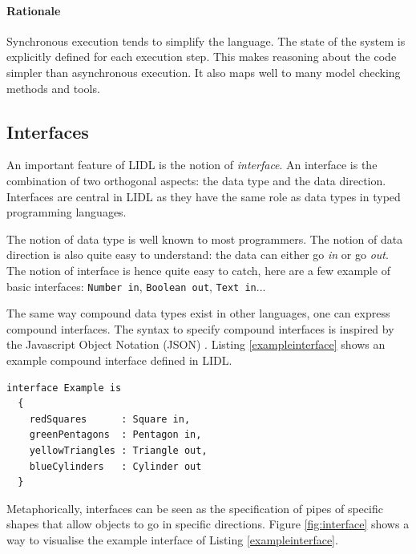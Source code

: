 \documentclass[10pt]{sigplanconf}
\newcommand{\code}[1]{\lstinline{#1}}
\begin{document}
\paragraph{Rationale}

Synchronous execution tends to simplify the language. The state of the system is explicitly defined for each execution step. This makes reasoning about the code simpler than asynchronous execution. It also maps well to many model checking methods and tools.


\subsection{Interfaces}

An important feature of LIDL is the notion of \emph{interface}. An interface is the combination of two orthogonal aspects: the data type and the data direction. Interfaces are central in LIDL as they have the same role as data types in typed programming languages.

The notion of data type is well known to most programmers. The notion of data direction is also quite easy to understand: the data can either go \emph{in} or go \emph{out}. The notion of interface is hence quite easy to catch, here are a few example of basic interfaces: \code{Number in}, \code{Boolean out}, \code{Text in}...

The same way compound data types exist in other languages, one can express compound interfaces. The syntax to specify compound interfaces is inspired by the Javascript Object Notation (JSON) \cite{jsonstandard}. Listing \ref{exampleinterface} shows an example compound interface defined in LIDL.


\begin{lstlisting}[caption=LIDL definition of the example interface,label=exampleinterface]
interface Example is
  {
    redSquares      : Square in,
    greenPentagons  : Pentagon in,
    yellowTriangles : Triangle out,
    blueCylinders   : Cylinder out
  }
\end{lstlisting}

Metaphorically, interfaces can be seen as the specification of pipes of specific shapes that allow objects to go in specific directions. Figure \ref{fig:interface} shows a way to visualise the example interface of Listing \ref{exampleinterface}.
\end{document}
